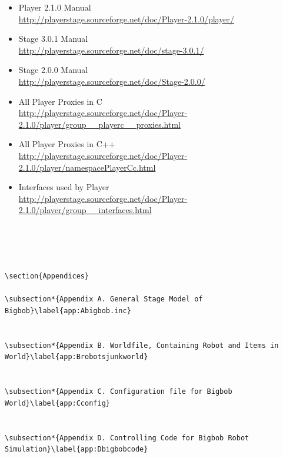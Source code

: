 \documentclass[a4paper]{report}
\begin{document}
\begin{itemize}

\item Player 2.1.0 Manual \\
\url{http://playerstage.sourceforge.net/doc/Player-2.1.0/player/}

\item Stage 3.0.1 Manual \\
\url{http://playerstage.sourceforge.net/doc/stage-3.0.1/}

\item Stage 2.0.0 Manual\\
\url{http://playerstage.sourceforge.net/doc/Stage-2.0.0/}

\item All Player Proxies in C\\
\url{http://playerstage.sourceforge.net/doc/Player-2.1.0/player/group__playerc__proxies.html}

\item All Player Proxies in C++\\
\url{http://playerstage.sourceforge.net/doc/Player-2.1.0/player/namespacePlayerCc.html}

\item Interfaces used by Player\\
\url{http://playerstage.sourceforge.net/doc/Player-2.1.0/player/group__interfaces.html}
\end{itemize}






\begin{verbatim}
 



\section{Appendices}

\subsection*{Appendix A. General Stage Model of Bigbob}\label{app:Abigbob.inc}


\subsection*{Appendix B. Worldfile, Containing Robot and Items in World}\label{app:Brobotsjunkworld}


\subsection*{Appendix C. Configuration file for Bigbob World}\label{app:Cconfig}


\subsection*{Appendix D. Controlling Code for Bigbob Robot Simulation}\label{app:Dbigbobcode}


\end{verbatim}
\end{document}
